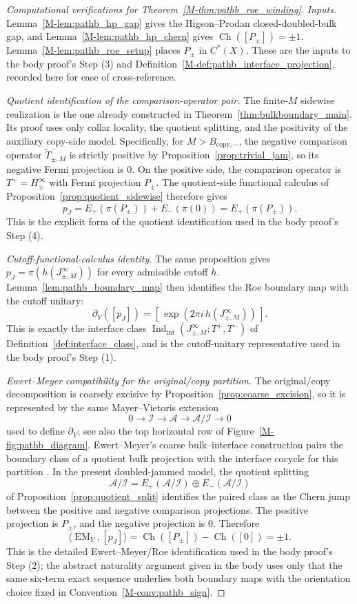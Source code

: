 \documentclass[11pt]{article}
\numberwithin{equation}{section}
\theoremstyle{definition}
\theoremstyle{remark}
\newcommand{\Indint}{\operatorname{Ind}_{\mathrm{int}}}
\newcommand{\Ch}{\operatorname{Ch}}
\begin{document}
\begin{proof}[Computational verifications for Theorem~\ref{M-thm:pathb_roe_winding}]
\textit{Inputs.}
Lemma~\ref{M-lem:pathb_hp_gap} gives the Higson--Prodan closed-doubled-bulk gap, and
Lemma~\ref{M-lem:pathb_hp_chern} gives \(\Ch([P_\pm])=\pm1\). Lemma~\ref{M-lem:pathb_roe_setup} places
\(P_\pm\) in \(C^*(X)\). These are the inputs to the body proof's Step (3) and
Definition~\ref{M-def:pathb_interface_projection}, recorded here for ease of cross-reference.

\smallskip\textit{Quotient identification of the comparison-operator pair.}
The finite-\(M\) sidewise realization is the one already constructed in
Theorem~\ref{thm:bulkboundary_main}. Its proof uses only collar locality, the quotient splitting,
and the positivity of the auxiliary copy-side model. Specifically, for \(M>B_{\mathrm{copy},-}\),
the negative comparison operator \(\widetilde T^-_{\pm,M}\) is strictly positive by
Proposition~\ref{prop:trivial_jam}, so its negative Fermi projection is \(0\). On the positive side,
the comparison operator is \(T^+=H_\pm^\infty\) with Fermi projection \(P_\pm\). The quotient-side
functional calculus of Proposition~\ref{prop:quotient_sidewise} therefore gives
\[
p_J=E_+(\pi(P_\pm))+E_-(\pi(0))=E_+(\pi(P_\pm)).
\]
This is the explicit form of the quotient identification used in the body proof's Step (4).

\smallskip\textit{Cutoff-functional-calculus identity.}
The same proposition gives \(p_J=\pi(h(J_{\pm,M}^\infty))\) for every admissible cutoff \(h\).
Lemma~\ref{lem:pathb_boundary_map} then identifies the Roe boundary map with the cutoff unitary:
\[
\partial_Y([p_J])
=
[\,\exp(2\pi i\,h(J_{\pm,M}^\infty))\,].
\]
This is exactly the interface class \(\Indint(J_{\pm,M}^\infty;T^+,T^-)\) of
Definition~\ref{def:interface_class}, and is the cutoff-unitary representative used in the body
proof's Step (1).

\smallskip\textit{Ewert--Meyer compatibility for the original/copy partition.}
The original/copy decomposition is coarsely excisive by Proposition~\ref{prop:coarse_excision}, so
it is represented by the same Mayer--Vietoris extension
\[
0\to \mathcal I\to\mathcal A\to\mathcal A/\mathcal I\to0
\]
used to define \(\partial_Y\); see also the top horizontal row of
Figure~\ref{M-fig:pathb_diagram}. Ewert--Meyer's coarse bulk--interface construction pairs the
boundary class of a quotient bulk projection with the interface cocycle for this partition
\cite{EwertMeyer2019}. In the present doubled-jammed model, the quotient splitting
\[
\mathcal A/\mathcal I=E_+(\mathcal A/\mathcal I)\oplus E_-(\mathcal A/\mathcal I)
\]
of Proposition~\ref{prop:quotient_split} identifies the paired class as the Chern jump between the
positive and negative comparison projections. The positive projection is \(P_\pm\), and the
negative projection is \(0\). Therefore
\[
\langle \operatorname{EM}_Y,[p_J]\rangle
=\Ch([P_\pm])-\Ch([0])
=\pm1.
\]
This is the detailed Ewert--Meyer/Roe identification used in the body proof's Step (2); the
abstract naturality argument given in the body uses only that the same six-term exact sequence
underlies both boundary maps with the orientation choice fixed in
Convention~\ref{M-conv:pathb_sign}.


\end{proof}
\end{document}
